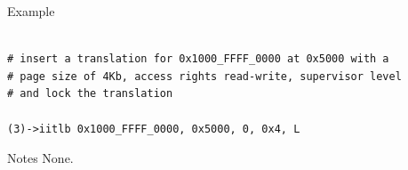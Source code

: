 \begin{iPageDescOpEntry}{Example}
\begin{lstlisting}[style=iPageOpStyle]

# insert a translation for 0x1000_FFFF_0000 at 0x5000 with a 
# page size of 4Kb, access rights read-write, supervisor level
# and lock the translation 

(3)->iitlb 0x1000_FFFF_0000, 0x5000, 0, 0x4, L

\end{lstlisting}
\end{iPageDescOpEntry}

\begin{iPageDescEntry}{Notes}
None.
\end{iPageDescEntry}
